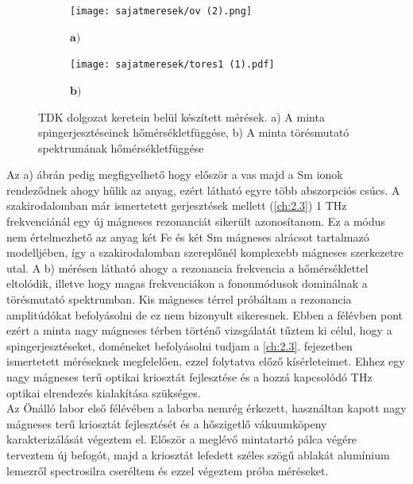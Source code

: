 \documentclass[a4paper,12pt]{article}
\numberwithin{equation}{section}
\begin{document}
\begin{figure}[H]
  \centering

  \begin{subfigure}[b]{0.43\textwidth}
  
    \caption*{$\bm{a)}$}
    \centering
    \texttt{[image: sajatmeresek/ov (2).png]}
  \end{subfigure}
  \hfill
  \begin{subfigure}[b]{0.53\textwidth}
  \caption*{$\bm{b)}$}
    \centering
    \texttt{[image: sajatmeresek/tores1 (1).pdf]}
  \end{subfigure}
  
  \caption{TDK dolgozat keretein belül készített mérések. a) A minta spingerjesztéseinek hőmérsékletfüggése, b) A minta törésmutató spektrumának hőmérsékletfüggése}
  \label{fig:tdk}
\end{figure}

Az a) ábrán pedig megfigyelhető hogy először a vas majd a Sm ionok rendeződnek ahogy hűlik az anyag, ezért látható egyre több abszorpciós csúcs. A szakirodalomban már ismertetett gerjesztések mellett (\ref{ch:2.3}) 1 THz frekvenciánál egy új mágneses rezonanciát sikerült azonosítanom. Ez a módus nem értelmezhető az anyag két Fe és két Sm mágneses alrácsot tartalmazó modelljében, így a szakirodalomban szereplőnél komplexebb mágneses szerkezetre utal. A b) mérésen látható ahogy a rezonancia frekvencia a hőmérséklettel eltolódik, illetve hogy magas frekvenciákon a fononmódusok dominálnak a törésmutató spektrumban. Kis mágneses térrel próbáltam a rezonancia amplitúdókat befolyásolni de ez nem bizonyult sikeresnek. Ebben a félévben pont ezért a minta nagy mágneses térben történő vizsgálatát tűztem ki célul, hogy a spingerjesztéseket, doméneket befolyásolni tudjam a \ref{ch:2.3}. fejezetben ismertetett méréseknek megfelelően, ezzel folytatva előző kísérleteimet. Ehhez egy nagy mágneses terű optikai kriosztát fejlesztése és a hozzá kapcsolódó THz optikai elrendezés kialakítása szükséges.\\
Az Önálló labor első félévében a laborba nemrég érkezett, használtan kapott nagy mágneses terű kriosztát fejlesztését és a hőszigetlő vákuumköpeny karakterizálását végeztem el. Először a meglévő mintatartó pálca végére terveztem új befogót, majd a kriosztát lefedett széles szögű ablakát alumínium lemezről spectrosilra cseréltem és ezzel végeztem próba méréseket.
\end{document}
